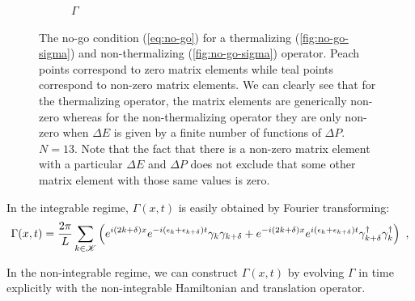 \begin{figure}
\begin{subfigure}{0.5\textwidth}
\caption{$\Gamma$}
\label{fig:no-go-gamma}
\end{subfigure}
\caption{The no-go condition (\ref{eq:no-go}) for a thermalizing (\ref{fig:no-go-sigma}) and non-thermalizing (\ref{fig:no-go-sigma}) operator. Peach points correspond to zero matrix elements while teal points correspond to non-zero matrix elements. We can clearly see that for the thermalizing operator, the matrix elements are generically non-zero whereas for the non-thermalizing operator they are only non-zero when $\Delta E$ is given by a finite number of functions of $\Delta P$. $N=13$. Note that the fact that there is a non-zero matrix element with a particular $\Delta E$ and $\Delta P$ does not exclude that some other matrix element with those same values is zero.}
\end{figure}


In the integrable regime, $\Gamma(x,t)$ is easily obtained by Fourier transforming:
\begin{equation}
\Gamma(x,t)=\frac{2\pi}{L}\sum_{k \in \mathcal{K}} \left(e^{i(2k+\delta)x} e^{-i(\epsilon_k+\epsilon_{k+\delta})t}\gamma_k \gamma_{k+\delta} + e^{-i(2k+\delta)x} e^{i(\epsilon_k+\epsilon_{k+\delta})t} \gamma^\dagger_{k+\delta} \gamma^\dagger_k\right)~,
\end{equation}

In the non-integrable regime, we can construct $\Gamma(x,t)$ by evolving $\Gamma$ in time explicitly with the non-integrable Hamiltonian and translation operator. 

